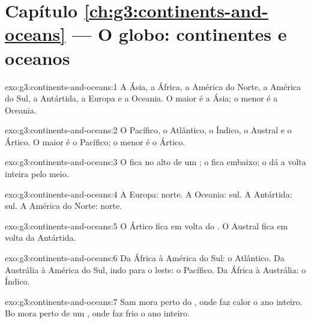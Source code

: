 \section*{Capítulo \ref{ch:g3:continents-and-oceans} --- O globo: continentes e oceanos}

\begin{solution}{exo:g3:continents-and-oceans:1}
A Ásia, a África, a América do Norte, a América do Sul, a Antártida, a
Europa e a Oceania. O maior é a Ásia; o menor é a Oceania.
\end{solution}

\begin{solution}{exo:g3:continents-and-oceans:2}
O Pacífico, o Atlântico, o Índico, o Austral e o Ártico.
O maior é o  Pacífico; o menor é o  Ártico.
\end{solution}

\begin{solution}{exo:g3:continents-and-oceans:3}
O  fica no alto de um ; o  fica embaixo; o 
dá a volta inteira pelo meio.
\end{solution}

\begin{solution}{exo:g3:continents-and-oceans:4}
A Europa: norte. A Oceania: sul. A Antártida: sul. A América do Norte:
norte.
\end{solution}

\begin{solution}{exo:g3:continents-and-oceans:5}
O  Ártico fica em volta do . O  Austral fica em
volta da Antártida.
\end{solution}

\begin{solution}{exo:g3:continents-and-oceans:6}
Da África à América do Sul: o  Atlântico. Da Austrália à América do
Sul, indo para o leste: o  Pacífico. Da África à Austrália: o 
Índico.
\end{solution}

\begin{solution}{exo:g3:continents-and-oceans:7}
Sam mora perto do , onde faz calor o ano inteiro. Bo mora perto de
um , onde faz frio o ano inteiro.
\end{solution}

